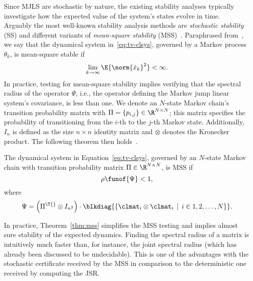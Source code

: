 Since MJLS are stochastic by nature, the existing stability analyses typically investigate how the expected value of the system's states evolve in time.
Arguably the most well-known stability analysis methods are \emph{stochastic stability} (SS) and different variants of \emph{mean-square stability} (MSS)~\cite{Feng:1992}.
Paraphrased from~\cite{Costa:2005}, we say that the dynamical system in~\eqref{eq:tv-clsys}, governed by a Markov process $\theta_k$, is mean-square stable if
%
\begin{equation*}%
    \lim_{k\rightarrow \infty} \E{\norm{\tilde{x}_k}^2} < \infty.
\end{equation*}
%
In practice, testing for mean-square stability implies verifying that the spectral radius of the operator $\Psi$, i.e., the operator defining the Markov jump linear system's covariance, is less than one.
We denote an $N$-state Markov chain's transition probability matrix with $\Pi = \left\{ p_{i,j} \right\} \in \R^{N \times N}$; this matrix specifies the probability of transitioning from the $i$-th to the $j$-th Markov state.
Additionally, $I_{n}$ is defined as the size $n \times n $ identity matrix and $\otimes$ denotes the Kronecker product.
The following theorem then holds~\cite{Costa:2005}.
%
\begin{theorem}%
    \label{thm:mss}%
    The dynamical system in Equation~\eqref{eq:tv-clsys}, governed by an $N$-state Markov chain with transition probability matrix $\Pi \in \R^{N \times N}$, is MSS if
    \begin{equation*}%
        \rho\funof{\Psi} < 1,
    \end{equation*}
    where
    \begin{equation*}%
        \Psi = \left( \Pi^\T{} \otimes I_{n^2} \right) \cdot \blkdiag{ \left\{ \clmat_i \otimes \clmat_i \, \mid \, i \in 1, 2, \ldots, N \right\} }.
    \end{equation*}
\end{theorem}
%
In practice, Theorem~\ref{thm:mss} simplifies the MSS testing and implies almost sure stability of the expected dynamics.
Finding the spectral radius of a matrix is intuitively much faster than, for instance, the joint spectral radius (which has already been discussed to be undecidable).
This is one of the advantages with the stochastic certificate received by the MSS in comparison to the deterministic one received by computing the JSR.


